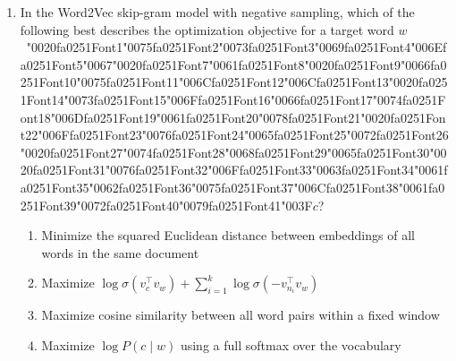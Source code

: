 \documentclass[12pt]{article}
\begin{document}
\begin{enumerate}[label=Q\arabic*.]
 \item In the Word2Vec skip-gram model with negative sampling, which of the following best describes the optimization objective for a target word $w$\ {\char"0020}{\csname fa0251Font1\endcsname\char"0075}{\csname fa0251Font2\endcsname\char"0073}{\csname fa0251Font3\endcsname\char"0069}{\csname fa0251Font4\endcsname\char"006E}{\csname fa0251Font5\endcsname\char"0067}{\char"0020}{\csname fa0251Font7\endcsname\char"0061}{\csname fa0251Font8\endcsname\char"0020}{\csname fa0251Font9\endcsname\char"0066}{\csname fa0251Font10\endcsname\char"0075}{\csname fa0251Font11\endcsname\char"006C}{\csname fa0251Font12\endcsname\char"006C}{\csname fa0251Font13\endcsname\char"0020}{\csname fa0251Font14\endcsname\char"0073}{\csname fa0251Font15\endcsname\char"006F}{\csname fa0251Font16\endcsname\char"0066}{\csname fa0251Font17\endcsname\char"0074}{\csname fa0251Font18\endcsname\char"006D}{\csname fa0251Font19\endcsname\char"0061}{\csname fa0251Font20\endcsname\char"0078}{\csname fa0251Font21\endcsname\char"0020}{\csname fa0251Font22\endcsname\char"006F}{\csname fa0251Font23\endcsname\char"0076}{\csname fa0251Font24\endcsname\char"0065}{\csname fa0251Font25\endcsname\char"0072}{\csname fa0251Font26\endcsname\char"0020}{\csname fa0251Font27\endcsname\char"0074}{\csname fa0251Font28\endcsname\char"0068}{\csname fa0251Font29\endcsname\char"0065}{\csname fa0251Font30\endcsname\char"0020}{\csname fa0251Font31\endcsname\char"0076}{\csname fa0251Font32\endcsname\char"006F}{\csname fa0251Font33\endcsname\char"0063}{\csname fa0251Font34\endcsname\char"0061}{\csname fa0251Font35\endcsname\char"0062}{\csname fa0251Font36\endcsname\char"0075}{\csname fa0251Font37\endcsname\char"006C}{\csname fa0251Font38\endcsname\char"0061}{\csname fa0251Font39\endcsname\char"0072}{\csname fa0251Font40\endcsname\char"0079}{\csname fa0251Font41\endcsname\char"003F}$c$?
 \begin{enumerate}[label=(\Alph*)]
     \item Minimize the squared Euclidean distance between embeddings of all words in the same document
     \item Maximize $\log \sigma(v_c^\top v_w) + \sum_{i=1}^{k} \log \sigma(-v_{n_i}^\top v_w)$
     \item Maximize cosine similarity between all word pairs within a fixed window
     \item Maximize $\log P(c \mid w)$ using a full softmax over the vocabulary
 \end{enumerate}
 

\end{enumerate}
\end{document}
